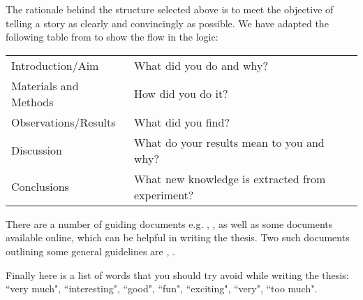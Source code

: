 The rationale behind the structure selected above is to meet the objective of telling a story as clearly and convincingly as possible. We have adapted the following table from \cite{barrass2002scientists} to show the flow in the logic:

\begin{table}[h]
	\centering
	\begin{tabular}{l|l} \hline
		Introduction/Aim  & What did you do and why? \\
		Materials and Methods & How did you do it? \\
		Observations/Results & What did you find? \\
		Discussion & What do your results mean to you and why? \\
		Conclusions & What new knowledge is extracted from experiment? \\ \hline
	\end{tabular}
	\label{tab:logic_flow}
\end{table}


There are a number of guiding documents e.g. \cite{murray2006write}, \cite{evans2003write}, as well as some documents available online, which can be helpful in writing the thesis. Two such documents outlining some general guidelines are \cite{howtothesis}, \cite{getthesis}.

Finally here is a list of words that you should try avoid while writing the thesis: ``very much", ``interesting", ``good", ``fun", ``exciting", ``very", ``too much".




